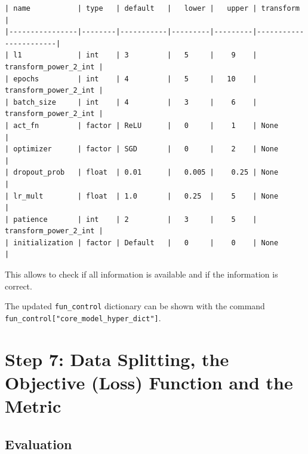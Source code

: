 \documentclass[
  letterpaper,
  DIV=11,
  numbers=noendperiod]{scrreprt}
\begin{document}
\begin{verbatim}
| name           | type   | default   |   lower |   upper | transform             |
|----------------|--------|-----------|---------|---------|-----------------------|
| l1             | int    | 3         |   5     |    9    | transform_power_2_int |
| epochs         | int    | 4         |   5     |   10    | transform_power_2_int |
| batch_size     | int    | 4         |   3     |    6    | transform_power_2_int |
| act_fn         | factor | ReLU      |   0     |    1    | None                  |
| optimizer      | factor | SGD       |   0     |    2    | None                  |
| dropout_prob   | float  | 0.01      |   0.005 |    0.25 | None                  |
| lr_mult        | float  | 1.0       |   0.25  |    5    | None                  |
| patience       | int    | 2         |   3     |    5    | transform_power_2_int |
| initialization | factor | Default   |   0     |    0    | None                  |
\end{verbatim}

This allows to check if all information is available and if the
information is correct.

\begin{tcolorbox}[enhanced jigsaw, rightrule=.15mm, coltitle=black, title=\textcolor{quarto-callout-note-color}{\faInfo}\hspace{0.5em}{Note: Hyperparameters of the Tuned Model and the \texttt{fun\_control}
Dictionary}, opacitybacktitle=0.6, bottomrule=.15mm, opacityback=0, left=2mm, colback=white, leftrule=.75mm, colframe=quarto-callout-note-color-frame, colbacktitle=quarto-callout-note-color!10!white, toprule=.15mm, toptitle=1mm, bottomtitle=1mm, titlerule=0mm, breakable, arc=.35mm]

The updated \texttt{fun\_control} dictionary can be shown with the
command \texttt{fun\_control{[}"core\_model\_hyper\_dict"{]}}.

\end{tcolorbox}

\section{Step 7: Data Splitting, the Objective (Loss) Function and the
Metric}\label{step-7-data-splitting-the-objective-loss-function-and-the-metric-2}

\subsection{Evaluation}\label{sec-selection-of-target-function-33}
\end{document}
